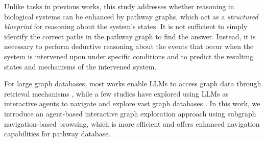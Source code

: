 Unlike tasks in previous works, this study addresses whether reasoning in biological systems can be enhanced by pathway graphs, which act as a \textit{structured blueprint} for reasoning about the system’s states. It is not sufficient to simply identify the correct paths in the pathway graph to find the answer. Instead, it is necessary to perform deductive reasoning about the events that occur when the system is intervened upon under specific conditions and to predict the resulting states and mechanisms of the intervened system.

For large graph databases, most works enable LLMs to access graph data through retrieval mechanisms \citep{he2024g, li2023chain}, while a few studies have explored using LLMs as interactive agents \citep{yao2023react, shinn2023reflexion, zhao2024empowering} to navigate and explore vast graph databases \citep{sun2023think, jin2024graph}. In this work, we introduce an agent-based interactive graph exploration approach using subgraph navigation-based browsing, which is more efficient and offers enhanced navigation capabilities for pathway database.